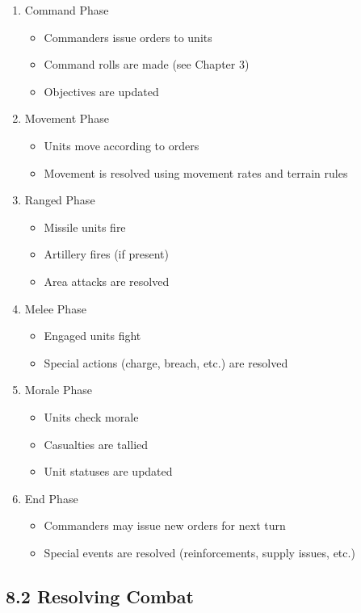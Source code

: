 \documentclass[11pt]{article}
\begin{document}
\begin{enumerate}
  \item Command Phase
    \begin{itemize}
      \item Commanders issue orders to units
      \item Command rolls are made (see Chapter 3)
      \item Objectives are updated
    \end{itemize}
  \item Movement Phase
    \begin{itemize}
      \item Units move according to orders
      \item Movement is resolved using movement rates and terrain rules
    \end{itemize}
  \item Ranged Phase
    \begin{itemize}
      \item Missile units fire
      \item Artillery fires (if present)
      \item Area attacks are resolved
    \end{itemize}
  \item Melee Phase
    \begin{itemize}
      \item Engaged units fight
      \item Special actions (charge, breach, etc.) are resolved
    \end{itemize}
  \item Morale Phase
    \begin{itemize}
      \item Units check morale
      \item Casualties are tallied
      \item Unit statuses are updated
    \end{itemize}
  \item End Phase
    \begin{itemize}
      \item Commanders may issue new orders for next turn
      \item Special events are resolved (reinforcements, supply issues, etc.)
    \end{itemize}
\end{enumerate}

\subsection{8.2 Resolving Combat}
\end{document}
